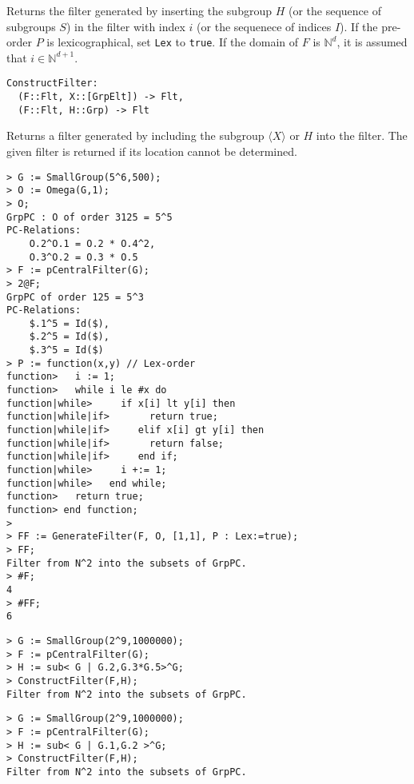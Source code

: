 \documentclass{amsart}
\begin{document}
Returns the filter generated by inserting the subgroup $H$ (or the sequence of subgroups $S$) in the filter with index $i$ (or the sequenece of indices $I$). 
If the pre-order $P$ is lexicographical, set {\tt Lex} to {\tt true}.
If the domain of $F$ is $\mathbb{N}^d$, it is assumed that $i\in\mathbb{N}^{d+1}$.

\color{blue}
\begin{verbatim}
ConstructFilter:
  (F::Flt, X::[GrpElt]) -> Flt,
  (F::Flt, H::Grp) -> Flt
\end{verbatim}
\color{black}

Returns a filter generated by including the subgroup $\langle X\rangle$ or $H$ into the filter.
The given filter is returned if its location cannot be determined.

{\small
\begin{lstlisting}[frame=single,basicstyle=\ttfamily\color{black!30!teal},backgroundcolor=\color{white!70!gray}]
> G := SmallGroup(5^6,500);
> O := Omega(G,1);
> O;
GrpPC : O of order 3125 = 5^5
PC-Relations:
    O.2^O.1 = O.2 * O.4^2, 
    O.3^O.2 = O.3 * O.5
> F := pCentralFilter(G);
> 2@F;
GrpPC of order 125 = 5^3
PC-Relations:
    $.1^5 = Id($), 
    $.2^5 = Id($), 
    $.3^5 = Id($)
> P := function(x,y) // Lex-order
function>   i := 1;
function>   while i le #x do
function|while>     if x[i] lt y[i] then
function|while|if>       return true;
function|while|if>     elif x[i] gt y[i] then
function|while|if>       return false;
function|while|if>     end if;
function|while>     i +:= 1;
function|while>   end while;
function>   return true;
function> end function;
>
> FF := GenerateFilter(F, O, [1,1], P : Lex:=true);
> FF;
Filter from N^2 into the subsets of GrpPC.
> #F;
4
> #FF;
6
\end{lstlisting}
\begin{lstlisting}[frame=single,basicstyle=\ttfamily\color{black!30!teal},backgroundcolor=\color{white!70!gray}]
> G := SmallGroup(2^9,1000000);
> F := pCentralFilter(G);
> H := sub< G | G.2,G.3*G.5>^G;
> ConstructFilter(F,H);                         
Filter from N^2 into the subsets of GrpPC.
\end{lstlisting}
\begin{lstlisting}[frame=single,basicstyle=\ttfamily\color{black!30!teal},backgroundcolor=\color{white!70!gray}]
> G := SmallGroup(2^9,1000000);
> F := pCentralFilter(G);
> H := sub< G | G.1,G.2 >^G;  
> ConstructFilter(F,H);
Filter from N^2 into the subsets of GrpPC.
\end{lstlisting}
}
\end{document}
